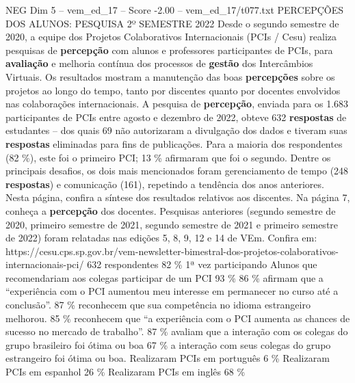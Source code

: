 \begin{textsample}{NEG Dim 5 – vem\_ed\_17 – Score -2.00 – vem\_ed\_17/t077.txt}  \label{ex:f5_neg_030}
PERCEPÇÕES DOS ALUNOS: PESQUISA 2º SEMESTRE 2022 Desde o segundo semestre de 2020, a equipe dos Projetos Colaborativos Internacionais (PCIs / Cesu) realiza pesquisas de \textbf{percepção} com alunos e professores participantes de PCIs, para \textbf{avaliação} e melhoria contínua dos processos de \textbf{gestão} dos Intercâmbios Virtuais.
Os resultados mostram a manutenção das boas \textbf{percepções} sobre os projetos ao longo do tempo, tanto por discentes quanto por docentes envolvidos nas colaborações internacionais.
A pesquisa de \textbf{percepção}, enviada para os 1.683 participantes de PCIs entre agosto e dezembro de 2022, obteve 632 \textbf{respostas} de estudantes – dos quais 69 não autorizaram a divulgação dos dados e tiveram suas \textbf{respostas} eliminadas para fins de publicações.
Para a maioria dos respondentes (82 \%), este foi o primeiro PCI; 13 \% afirmaram que foi o segundo.
Dentre os principais desafios, os dois mais mencionados foram gerenciamento de tempo (248 \textbf{respostas}) e comunicação (161), repetindo a tendência dos anos anteriores.
Nesta página, confira a síntese dos resultados relativos aos discentes.
Na página 7, conheça a \textbf{percepção} dos docentes.
Pesquisas anteriores (segundo semestre de 2020, primeiro semestre de 2021, segundo semestre de 2021 e primeiro semestre de 2022) foram relatadas nas edições 5, 8, 9, 12 e 14 de VEm.
Confira em: https://cesu.cps.sp.gov.br/vem-newsletter-bimestral-dos-projetos-colaborativos-internacionais-pci/ 632 respondentes 82 \% 1ª vez participando Alunos que recomendariam aos colegas participar de um PCI 93 \% 86 \% afirmam que a “experiência com o PCI aumentou meu interesse em permanecer no curso até a conclusão”. 87 \% reconhecem que sua competência no idioma estrangeiro melhorou. 85 \% reconhecem que “a experiência com o PCI aumenta as chances de sucesso no mercado de trabalho”. 87 \% avaliam que a interação com os colegas do grupo brasileiro foi ótima ou boa 67 \% a interação com seus colegas do grupo estrangeiro foi ótima ou boa.
Realizaram PCIs em português 6 \% Realizaram PCIs em espanhol 26 \% Realizaram PCIs em inglês 68 \%

\end{textsample}

